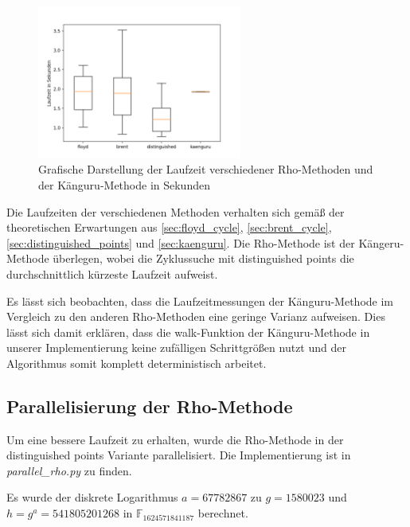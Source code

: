 \documentclass{scrartcl}
\begin{document}
\begin{figure}[h]
  \centering
  \includegraphics[width=0.6\textwidth]{../projekt/benchmark/plot_dlp.png}
  \caption{Grafische Darstellung der Laufzeit verschiedener Rho-Methoden und der Känguru-Methode in Sekunden}
  \label{fig:benchmark}
\end{figure}

Die Laufzeiten der verschiedenen Methoden verhalten sich gemäß der
theoretischen Erwartungen aus \ref{sec:floyd_cycle},
\ref{sec:brent_cycle}, \ref{sec:distinguished_points} und
\ref{sec:kaenguru}.
Die Rho-Methode ist der Kängeru-Methode überlegen,
wobei die Zyklussuche mit distinguished points die durchschnittlich
kürzeste Laufzeit aufweist.

Es lässt sich beobachten, dass die Laufzeitmessungen der Känguru-Methode im Vergleich zu den anderen Rho-Methoden eine geringe Varianz
aufweisen.
Dies lässt sich damit erklären, dass die walk-Funktion der
Känguru-Methode in unserer Implementierung keine zufälligen
Schrittgrößen nutzt und der Algorithmus somit komplett deterministisch
arbeitet.

\subsection{Parallelisierung der Rho-Methode}

Um eine bessere Laufzeit zu erhalten, wurde die Rho-Methode in der distinguished points Variante parallelisiert. 
Die Implementierung ist in \emph{parallel\_rho.py} zu finden.

Es wurde der diskrete Logarithmus \( a = 67782867 \) zu \( g = 1580023 \)
und \(h = g^a = 541805201268 \) in \( \mathbb{F}_{1624571841187} \) berechnet.
\end{document}
